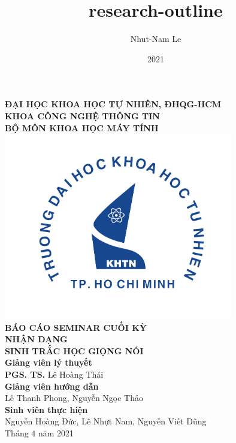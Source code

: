 \documentclass{article}
\title{research-outline}
\author{Nhut-Nam Le}
\date{2021}
\newcommand\B{\rule[-1.2ex]{0pt}{0pt}} %
\begin{document}
	\begin{titlepage}
		\begin{center}
			\large{\textbf{ĐẠI HỌC KHOA HỌC TỰ NHIÊN, ĐHQG-HCM\\KHOA CÔNG NGHỆ THÔNG TIN\\BỘ MÔN KHOA HỌC MÁY TÍNH}}\\
			\includegraphics[width=0.75\textwidth]{images/khtn.png}\\
			\large \textbf{BÁO CÁO SEMINAR CUỐI KỲ}\\[0.1in]
			\huge \textbf{NHẬN DẠNG}\\[0.1in]
			\huge \textbf{SINH TRẮC HỌC GIỌNG NÓI}\\[0.1in]
			\vfill
			\normalsize
			\normalsize
			\textbf{Giảng viên lý thuyết}\\
			{\textbf{PGS. TS.} Lê Hoàng Thái}\\[0.1in]
			\textbf{Giảng viên hướng dẫn}\\
			\vspace{0.1in}
			{Lê Thanh Phong, Nguyễn Ngọc Thảo}\\[0.1in]
			\textbf{Sinh viên thực hiện} \\
			\vspace{0.1in}
			{Nguyễn Hoàng Đức, Lê Nhựt Nam, Nguyễn Viết Dũng}\\[0.1in]
			\vfill
			Tháng 4 năm 2021
		\end{center}
	\end{titlepage}
	\newpage
	
	\cleardoublepage
	
\end{document}
